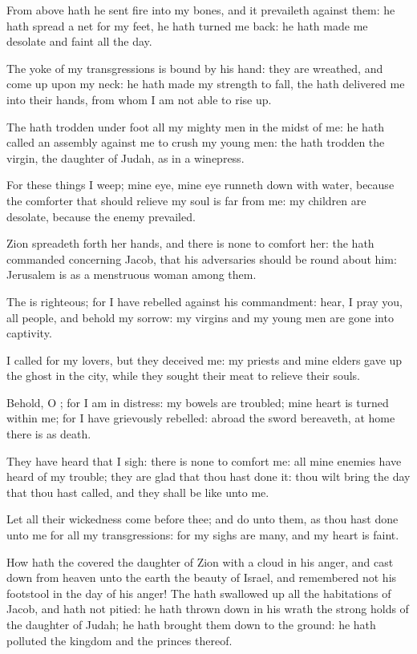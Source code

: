 \Verse From above hath he sent fire into my bones, and it prevaileth against them: he hath spread a net for my feet, he hath turned me back: he hath made me desolate and faint all the day.

\Verse The yoke of my transgressions is bound by his hand: they are wreathed, and come up upon my neck: he hath made my strength to fall, the \LORD hath delivered me into their hands, from whom I am not able to rise up.

\Verse The \LORD hath trodden under foot all my mighty men in the midst of me: he hath called an assembly against me to crush my young men: the \LORD hath trodden the virgin, the daughter of Judah, as in a winepress.

\Verse For these things I weep; mine eye, mine eye runneth down with water, because the comforter that should relieve my soul is far from me: my children are desolate, because the enemy prevailed.

\Verse Zion spreadeth forth her hands, and there is none to comfort her: the \LORD hath commanded concerning Jacob, that his adversaries should be round about him: Jerusalem is as a menstruous woman among them.

\Verse The \LORD is righteous; for I have rebelled against his commandment: hear, I pray you, all people, and behold my sorrow: my virgins and my young men are gone into captivity.

\Verse I called for my lovers, but they deceived me: my priests and mine elders gave up the ghost in the city, while they sought their meat to relieve their souls.

\Verse Behold, O \LORD; for I am in distress: my bowels are troubled; mine heart is turned within me; for I have grievously rebelled: abroad the sword bereaveth, at home there is as death.

\Verse They have heard that I sigh: there is none to comfort me: all mine enemies have heard of my trouble; they are glad that thou hast done it: thou wilt bring the day that thou hast called, and they shall be like unto me.

\Verse Let all their wickedness come before thee; and do unto them, as thou hast done unto me for all my transgressions: for my sighs are many, and my heart is faint.


\Chapter
\Verse How hath the \LORD covered the daughter of Zion with a cloud in his anger, and cast down from heaven unto the earth the beauty of Israel, and remembered not his footstool in the day of his anger!  \Verse The \LORD hath swallowed up all the habitations of Jacob, and hath not pitied: he hath thrown down in his wrath the strong holds of the daughter of Judah; he hath brought them down to the ground: he hath polluted the kingdom and the princes thereof.

